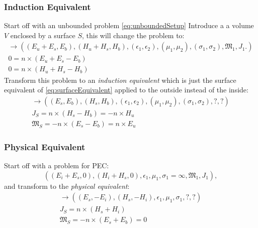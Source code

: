 \documentclass{article}
\numberwithin{equation}{section}
\begin{document}
\subsubsection*{Induction Equivalent}
    Start off with an unbounded problem \eqref{eq:unboundedSetup}
Introduce a a volume $V$ enclosed by a surface $S$, this will change the problem to:
\begin{subequations} \label{eq:inductionSetup}
\begin{align}
    \to \left( (E_u + E_s, E_b), (H_u + H_s, H_b), (\epsilon_1, \epsilon_2), (\mu_1, \mu_2), (\sigma_1, \sigma_2), \mathfrak{M}_1, J_1. \right) \\
    0 = n \times ( E_u + E_s - E_b ) \\
    0 = n \times ( H_u + H_s - H_b )
\end{align}
\end{subequations}
Transform this problem to an \emph{induction equivalent} which is just the surface equivalent of \eqref{eq:surfaceEquivalent} applied to the outside instead of the inside:
\begin{subequations} \label{eq:inductionEquivalent}
\begin{align}
    \to \left( (E_s, E_b), (H_s, H_b), (\epsilon_1, \epsilon_2), (\mu_1, \mu_2), (\sigma_1, \sigma_2), ?, ? \right) \\
    J_S = n \times ( H_s - H_b ) = -n \times H_u \\
    \mathfrak{M}_S = -n \times ( E_s - E_b ) = n \times E_u
\end{align}
\end{subequations}
\subsubsection*{Physical Equivalent}
Start off with a problem for PEC:
\begin{equation} \label{eq:pecSetup}
    \left( (E_i + E_s, 0), (H_i + H_s, 0), \epsilon_1, \mu_1, \sigma_1=\infty, \mathfrak{M}_1, J_1 \right),
\end{equation}
and transform to the \emph{physical equivalent}:
\begin{subequations} \label{eq:physicalEquivalent}
\begin{align}
    \to \left( (E_s, -E_i), (H_s, -H_i), \epsilon_1, \mu_1, \sigma_1, ?, ? \right) \\
    J_S = n \times ( H_s + H_i ) \\
    \mathfrak{M}_S = -n \times ( E_s + E_b ) = 0
\end{align}
\end{subequations}
\newpage
\end{document}
